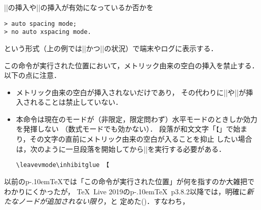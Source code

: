 \documentclass[a4paper,11pt,nomag]{jsarticle}
\def\pTeX{p\kern-.10em\TeX}
\begin{document}
\begin{cslist}
\csitem[\.{showmode}]
  |\kanjiskip|の挿入や|\xkanjiskip|の挿入が有効になっているか否かを
\begin{verbatim}
> auto spacing mode;
> no auto xspacing mode.
\end{verbatim}
  という形式（上の例では|\autospacing|かつ|\noautoxspacing|の状況）で端末やログに表示する．

\csitem[\.{inhibitglue}]
  この命令が実行された位置において，メトリック由来の空白の挿入を禁止する．以下の点に注意．
\begin{itemize}
 \item メトリック由来の空白が挿入されないだけであり，
       その代わりに|\kanjiskip|や|\xkanjiskip|が挿入されることは禁止していない．
 \item 本命令は現在のモードが（非限定，限定問わず）水平モードのときしか効力を発揮しない
       （数式モードでも効かない）．
       段落が和文文字「\verb+【+」で始まり，その文字の直前にメトリック由来の空白が入ることを抑止
       したい場合は，次のように一旦段落を開始してから|\inhibitglue|を実行する必要がある．
\begin{verbatim}
\leavevmode\inhibitglue 【
\end{verbatim}
\end{itemize}
  以前の\pTeX では「この命令が実行された位置」が何を指すのか大雑把でわかりにくかったが，
  \TeX~Live 2019の\pTeX~p3.8.2以降では，明確に\emph{新たなノードが追加されない限り}，と
  定めた(\cite{build28,forum_2566})．すなわち，
\end{cslist}
\end{document}
